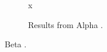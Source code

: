 \documentclass{article}
\begin{document}
\listoffigures
\begin{figure}\centering x \caption{Results from Alpha \cite{ka}.}\end{figure}
Beta \cite{kb}.


\end{document}
